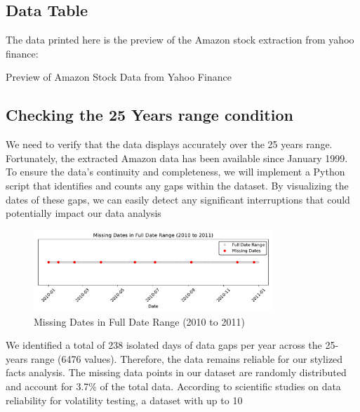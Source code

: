 \documentclass{article}
\begin{document}
\subsection{Data Table}
The data printed here is the preview of the Amazon stock extraction from yahoo finance:
\begin{table}[h!]
    \centering
      
    \caption{Preview of Amazon Stock Data from Yahoo Finance}
    \label{tab:amazon_stock_preview}
\end{table}



\subsection{Checking the 25 Years range condition}


We need to verify that the data displays accurately over the 25 years range. 
Fortunately, the extracted  Amazon data has been available since January 1999. 
To ensure the data’s continuity and completeness, we will implement a Python script that identifies and counts any gaps within the dataset. 
By visualizing the dates of these gaps, we can easily detect any significant interruptions that could potentially impact our data analysis

\begin{figure}[H]
    \centering
    \includegraphics[width=0.8\textwidth]{Img/MissingDates(2010_to_2011).pdf}
    \caption{Missing Dates in Full Date Range (2010 to 2011)}
    \label{fig:missing_dates}
\end{figure}

\noindent We identified a total of 238 isolated days of data gaps per year across the 25-years range (6476 values). 
Therefore, the data remains reliable for our stylized facts analysis. 
The missing data points in our dataset are randomly distributed and account for 3.7\% of the total data. 
According to scientific studies on data reliability for volatility testing, a dataset with up to 10%
\cite{pumi2023longrange} 
\end{document}

